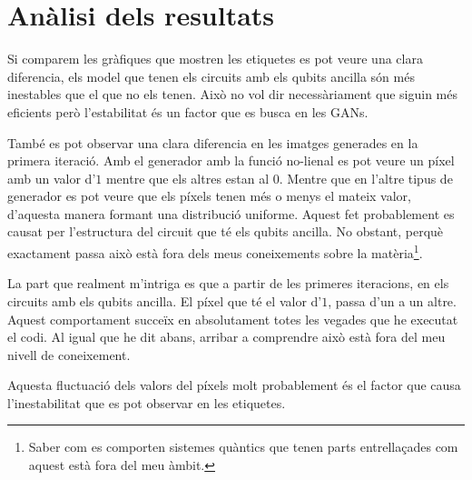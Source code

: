 \section{Anàlisi dels resultats}
Si comparem les gràfiques que mostren les etiquetes es pot veure una clara diferencia, els model que tenen els circuits amb els qubits ancilla són més inestables que el que no els tenen. Això no vol dir necessàriament que siguin més eficients però l'estabilitat és un factor que es busca en les GANs. 

També es pot observar una clara diferencia en les imatges generades en la primera iteració. Amb el generador amb la funció no-lienal es pot veure un píxel amb un valor d'$1$ mentre que els altres estan al $0$. Mentre que en l'altre tipus de generador es pot veure que els píxels tenen més o menys el mateix valor, d'aquesta manera formant una distribució uniforme. Aquest fet probablement es causat per l'estructura del circuit que té els qubits ancilla. No obstant, perquè exactament passa això està fora dels meus coneixements sobre la matèria\footnote{Saber com es comporten sistemes quàntics que tenen parts entrellaçades com aquest està fora del meu àmbit.}. 

La part que realment m'intriga es que a partir de les primeres iteracions, en els circuits amb els qubits ancilla. El píxel que té el valor d'$1$, passa d'un a un altre. Aquest comportament succeïx en absolutament totes les vegades que he executat el codi. Al igual que he dit abans, arribar a comprendre això està fora del meu nivell de coneixement. 

Aquesta fluctuació dels valors del píxels molt probablement és el factor que causa l'inestabilitat que es pot observar en les etiquetes. 
 